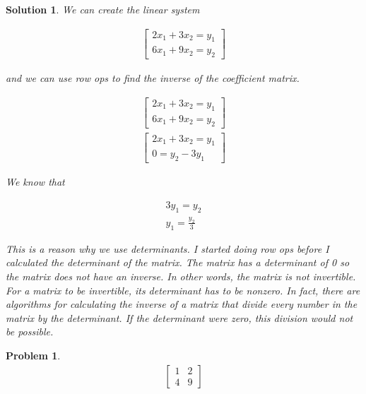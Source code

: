 \documentclass{article}
\newtheorem{problem}{Problem}
\newtheorem*{solution}{Solution}
\begin{document}
\begin{solution}
We can create the linear system

\begin{align*}
\begin{bmatrix}
2x_{1} + 3x_{2} = y_{1} \\
6x_{1} + 9x_{2} = y_{2}
\end{bmatrix}
\end{align*}

and we can use row ops to find the inverse of the coefficient matrix.

\begin{align*}
\begin{bmatrix}
2x_{1} + 3x_{2} = y_{1} \\
6x_{1} + 9x_{2} = y_{2}
\end{bmatrix} \\
\begin{bmatrix}
2x_{1} + 3x_{2} = y_{1} \\
0 = y_{2} - 3y_{1}
\end{bmatrix} 
\end{align*}

We know that

\begin{align*}
3y_{1} = y_{2} \\
y_{1} = \frac{y_{2}}{3}
\end{align*}

This is a reason why we use determinants. I started doing row ops before I calculated the determinant of the matrix. The matrix has a determinant of 0 so the matrix does not have an inverse. In other words, the matrix is not invertible. For a matrix to be invertible, its determinant has to be nonzero. In fact, there are algorithms for calculating the inverse of a matrix that divide every number in the matrix by the determinant. If the determinant were zero, this division would not be possible. 

\end{solution}

\begin{problem}
\begin{align*}
\begin{bmatrix}
1 & 2 \\ 4 & 9
\end{bmatrix}
\end{align*}
\end{problem}
\end{document}
